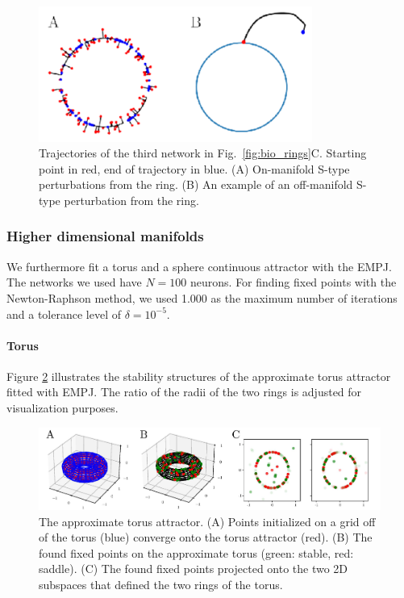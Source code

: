 \documentclass{article} %
\newcounter{ct}
\theoremstyle{definition}
\theoremstyle{remark}
\begin{document}
\begin{figure}[h]
\centering
\includegraphics[width=0.8\textwidth]{empj_onoff_perturbation_s}
\caption{Trajectories of the third network in Fig.~\ref{fig:bio_rings}C. Starting point in red, end of trajectory in blue.
(A) On-manifold S-type perturbations from the ring.
(B) An example of an off-manifold  S-type perturbation from the ring.
}\label{fig:empj_onoff_perturbation}
\end{figure}




\subsubsection{Higher dimensional manifolds}
We furthermore fit a torus and a sphere continuous attractor with the EMPJ.
The networks we used have \(N = 100\) neurons.
For finding fixed points with the Newton-Raphson method, we used 1.000  as the maximum number of iterations  and a tolerance level of \(\delta = 10^{-5}\).

\paragraph{Torus}
Figure \ref{fig:torus_empj} illustrates the stability structures of  the approximate torus attractor fitted with EMPJ.
The ratio of the radii of the two rings is adjusted for visualization purposes.
\begin{figure}[h]
\centering
\includegraphics[width=\textwidth]{torus_empj_ss}
\caption{The approximate torus attractor.
(A) Points initialized on a grid off of the torus (blue) converge onto the torus attractor (red).
(B) The found fixed points on the approximate torus (green: stable, red: saddle).
(C) The found fixed points projected onto the two 2D subspaces that defined the two rings of the torus.
}\label{fig:torus_empj}
\end{figure}
\end{document}
